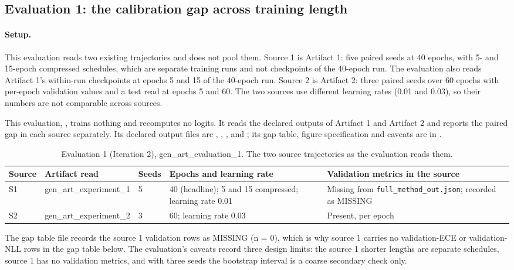\documentclass[11pt,letterpaper]{article}
\begin{document}
\subsection{Evaluation 1: the calibration gap across training length}

\paragraph{Setup.} This evaluation reads two existing trajectories and does not pool them. Source 1 is Artifact 1: five paired seeds at 40 epochs, with 5- and 15-epoch compressed schedules, which are separate training runs and not checkpoints of the 40-epoch run. The evaluation also reads Artifact 1's within-run checkpoints at epochs 5 and 15 of the 40-epoch run. Source 2 is Artifact 2: three paired seeds over 60 epochs with per-epoch validation values and a test read at epochs 5 and 60. The two sources use different learning rates (0.01 and 0.03), so their numbers are not comparable across sources.


This evaluation, , trains nothing and recomputes no logits. It reads the declared outputs of Artifact 1 and Artifact 2 and reports the paired gap in each source separately. Its declared output files are , , ,  and ; its gap table, figure specification and caveats are in .

\begin{table}[!htbp]
\centering
\footnotesize
\caption{Evaluation 1 (Iteration 2), gen\_art\_evaluation\_1. The two source trajectories as the evaluation reads them.}
\label{tab:sources5}
\begin{tabular}{p{1.4cm}p{3.6cm}p{1.2cm}p{4.2cm}p{4.6cm}}
\toprule
Source & Artifact read & Seeds & Epochs and learning rate & Validation metrics in the source \\
\midrule
S1 & gen\_art\_experiment\_1 & 5 & 40 (headline); 5 and 15 compressed; learning rate 0.01 & Missing from \texttt{full\_method\_out.json}; recorded as MISSING \\
S2 & gen\_art\_experiment\_2 & 3 & 60; learning rate 0.03 & Present, per epoch \\
\bottomrule
\end{tabular}
\end{table}

The gap table file records the source 1 validation rows as MISSING (n = 0), which is why source 1 carries no validation-ECE or validation-NLL rows in the gap table below. The evaluation's caveats record three design limits: the source 1 shorter lengths are separate schedules, source 1 has no validation metrics, and with three seeds the bootstrap interval is a coarse secondary check only.
\end{document}
